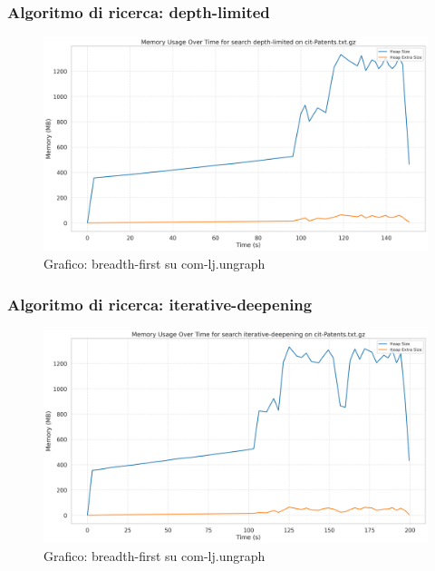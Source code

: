 \documentclass{article}
\begin{document}
\subsubsection{Algoritmo di ricerca: depth-limited}
\begin{figure}[h]\centering
	\includegraphics[width=\textwidth]{../plots/cit-Patents_depth-limited.png}
	\caption{Grafico: breadth-first su com-lj.ungraph}
\end{figure}
\subsubsection{Algoritmo di ricerca: iterative-deepening}
\begin{figure}[h]\centering
	\includegraphics[width=\textwidth]{../plots/cit-Patents_iterative-deepening.png}
	\caption{Grafico: breadth-first su com-lj.ungraph}
\end{figure}
\end{document}
